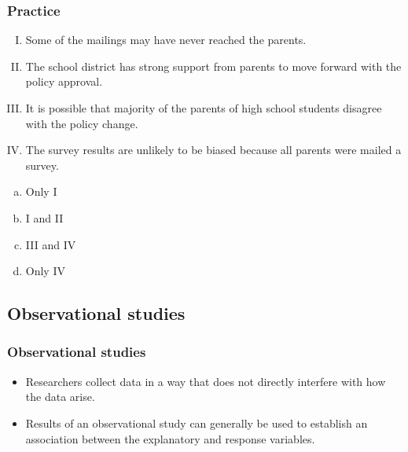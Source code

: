 \documentclass[slidestop,compress,mathserif]{beamer}
\begin{document}
\begin{frame}[shrink]
\frametitle{Practice}

{\small
{}

\begin{enumerate}[I.]
\item Some of the mailings may have never reached the parents.
\item The school district has strong support from parents to move forward with the policy approval.
\item It is possible that majority of the parents of high school students disagree with the policy change.
\item The survey results are unlikely to be biased because all parents were mailed a survey. 
\end{enumerate}

\begin{multicols}{5}
\begin{enumerate}[(a)]
\item Only I
\item I and II
\item III and IV
\item Only IV
\end{enumerate}
\end{multicols}
}

\end{frame}


\subsection{Observational studies}


\begin{frame}
\frametitle{Observational studies}

\begin{itemize}

\item Researchers collect data in a way that does not directly interfere with how the data arise.

\item Results of an observational study can generally be used to establish an association between the explanatory and response variables.

\end{itemize}

\end{frame}
\end{document}
